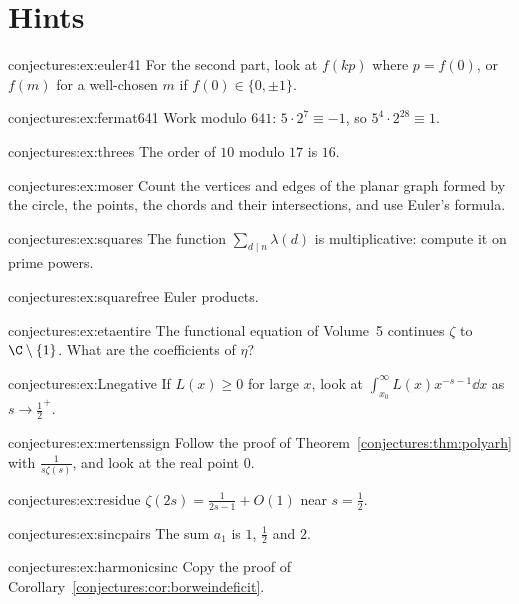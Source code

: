 \section{Hints}

\begin{hint}{conjectures:ex:euler41}
For the second part, look at $f(kp)$ where $p=f(0)$, or $f(m)$ for a well-chosen $m$ if $f(0)\in\{0,\pm1\}$.
\end{hint}
\begin{hint}{conjectures:ex:fermat641}
Work modulo $641$: $5\cdot2^7\equiv-1$, so $5^4\cdot2^{28}\equiv1$.
\end{hint}
\begin{hint}{conjectures:ex:threes}
The order of $10$ modulo $17$ is $16$.
\end{hint}
\begin{hint}{conjectures:ex:moser}
Count the vertices and edges of the planar graph formed by the circle, the points, the chords and their intersections, and use Euler's formula.
\end{hint}
\begin{hint}{conjectures:ex:squares}
The function $\sum_{d\mid n}\lambda(d)$ is multiplicative: compute it on prime powers.
\end{hint}
\begin{hint}{conjectures:ex:squarefree}
Euler products.
\end{hint}
\begin{hint}{conjectures:ex:etaentire}
The functional equation of Volume~5 continues $\zeta$ to $\C\setminus\{1\}$. What are the coefficients of $\eta$?
\end{hint}
\begin{hint}{conjectures:ex:Lnegative}
If $L(x)\ge0$ for large $x$, look at $\int_{x_0}^\infty L(x)x^{-s-1}\dd x$ as $s\to\frac12^+$.
\end{hint}
\begin{hint}{conjectures:ex:mertenssign}
Follow the proof of Theorem~\ref{conjectures:thm:polyarh} with $\frac1{s\zeta(s)}$, and look at the real point $0$.
\end{hint}
\begin{hint}{conjectures:ex:residue}
$\zeta(2s)=\frac1{2s-1}+O(1)$ near $s=\frac12$.
\end{hint}
\begin{hint}{conjectures:ex:sincpairs}
The sum $a_1$ is $1$, $\frac12$ and $2$.
\end{hint}
\begin{hint}{conjectures:ex:harmonicsinc}
Copy the proof of Corollary~\ref{conjectures:cor:borweindeficit}.
\end{hint}

